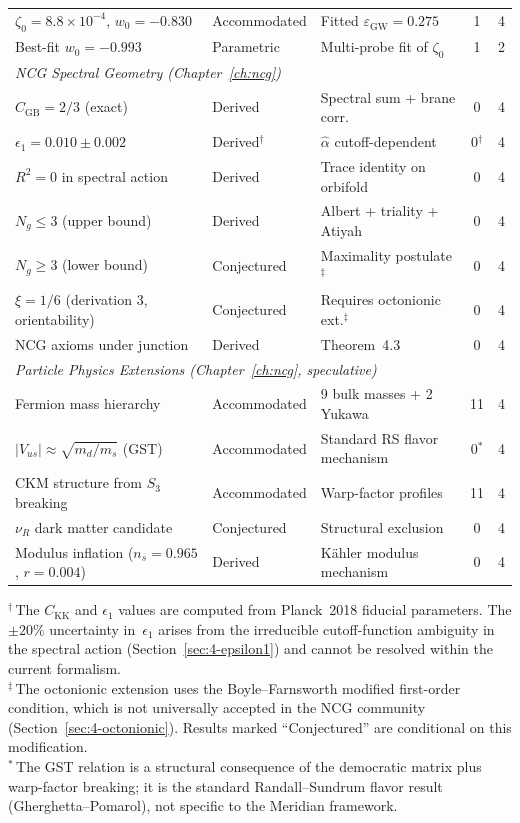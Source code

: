 \documentclass[10pt,a4paper,openany,twocolumn]{book}
\theoremstyle{definition}
\theoremstyle{remark}
\begin{document}
\begin{center}
\begin{longtable}{p{4.8cm} l p{4.2cm} c c}
$\zeta_0 = 8.8 \times 10^{-4}$, $w_0 = -0.830$ & Accommodated & Fitted $\varepsilon_\mathrm{GW} = 0.275$ & 1 & 4 \\
Best-fit $w_0 = -0.993$ & Parametric & Multi-probe fit of $\zeta_0$ & 1 & 2 \\[6pt]
\multicolumn{5}{l}{\emph{NCG Spectral Geometry (Chapter~\ref{ch:ncg})}} \\[3pt]
$C_\mathrm{GB} = 2/3$ (exact) & Derived & Spectral sum + brane corr. & 0 & 4 \\
$\epsilon_1 = 0.010 \pm 0.002$ & Derived$^\dag$ & $\hat{\alpha}$ cutoff-dependent & 0$^\dag$ & 4 \\
$R^2 = 0$ in spectral action & Derived & Trace identity on orbifold & 0 & 4 \\
$N_g \leq 3$ (upper bound) & Derived & Albert + triality + Atiyah & 0 & 4 \\
$N_g \geq 3$ (lower bound) & Conjectured & Maximality postulate$^\ddag$ & 0 & 4 \\
$\xi = 1/6$ (derivation 3, orientability) & Conjectured & Requires octonionic ext.$^\ddag$ & 0 & 4 \\
NCG axioms under junction & Derived & Theorem~4.3 & 0 & 4 \\[6pt]
\multicolumn{5}{l}{\emph{Particle Physics Extensions (Chapter~\ref{ch:ncg}, speculative)}} \\[3pt]
Fermion mass hierarchy & Accommodated & 9 bulk masses + 2 Yukawa & 11 & 4 \\
$|V_{us}| \approx \sqrt{m_d/m_s}$ (GST) & Accommodated & Standard RS flavor mechanism & 0$^*$ & 4 \\
CKM structure from $S_3$ breaking & Accommodated & Warp-factor profiles & 11 & 4 \\
$\nu_R$ dark matter candidate & Conjectured & Structural exclusion & 0 & 4 \\
Modulus inflation ($n_s = 0.965$, $r = 0.004$) & Derived & K\"ahler modulus mechanism & 0 & 4 \\[3pt]
\hline
\end{longtable}
\end{center}

\noindent
\footnotesize
$^\dag$\,The $C_\mathrm{KK}$ and $\epsilon_1$ values are computed from Planck~2018 fiducial parameters. The $\pm 20\%$ uncertainty in~$\epsilon_1$ arises from the irreducible cutoff-function ambiguity in the spectral action (Section~\ref{sec:4-epsilon1}) and cannot be resolved within the current formalism.\\[2pt]
$^\ddag$\,The octonionic extension uses the Boyle--Farnsworth modified first-order condition, which is not universally accepted in the NCG community (Section~\ref{sec:4-octonionic}). Results marked ``Conjectured'' are conditional on this modification.\\[2pt]
$^*$\,The GST relation is a structural consequence of the democratic matrix plus warp-factor breaking; it is the standard Randall--Sundrum flavor result (Gherghetta--Pomarol), not specific to the Meridian framework.
\end{document}
